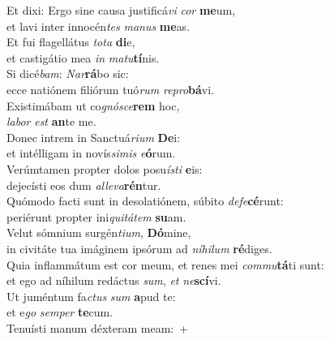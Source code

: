 \oddverse Et dixi: Ergo sine causa justificá\textit{vi} \textit{cor} \textbf{me}um,~\*\\
\oddverse et lavi inter innocén\textit{tes} \textit{ma}\textit{nus} \textbf{me}as.\\
\evenverse Et fui flagellátus \textit{to}\textit{ta} \textbf{di}e,~\*\\
\evenverse et castigátio mea \textit{in} \textit{ma}\textit{tu}\textbf{tí}nis.\\
\oddverse Si dicé\textit{bam}: \textit{Nar}\textbf{rá}bo sic:~\*\\
\oddverse ecce natiónem filiórum tuó\textit{rum} \textit{re}\textit{pro}\textbf{bá}vi.\\
\evenverse Existimábam ut co\textit{gnó}\textit{sce}\textbf{rem} hoc,~\*\\
\evenverse \textit{la}\textit{bor} \textit{est} \textbf{an}te me.\\
\oddverse Donec intrem in Sanctuá\textit{ri}\textit{um} \textbf{De}i:~\*\\
\oddverse et intélligam in novís\textit{si}\textit{mis} \textit{e}\textbf{ó}rum.\\
\evenverse Verúmtamen propter dolos posu\textit{í}\textit{sti} \textbf{e}is:~\*\\
\evenverse dejecísti eos dum \textit{al}\textit{le}\textit{va}\textbf{rén}tur.\\
\oddverse Quómodo facti sunt in desolatiónem, súbito \textit{de}\textit{fe}\textbf{cé}runt:~\*\\
\oddverse periérunt propter ini\textit{qui}\textit{tá}\textit{tem} \textbf{su}am.\\
\evenverse Velut sómnium surgén\textit{ti}\textit{um}, \textbf{Dó}mine,~\*\\
\evenverse in civitáte tua imáginem ipsórum ad \textit{ní}\textit{hi}\textit{lum} \textbf{ré}diges.\\
\oddverse Quia inflammátum est cor meum, et renes mei \textit{com}\textit{mu}\textbf{tá}ti sunt:~\*\\
\oddverse et ego ad níhilum redáctus \textit{sum}, \textit{et} \textit{ne}\textbf{scí}vi.\\
\evenverse Ut juméntum fa\textit{ctus} \textit{sum} \textbf{a}pud te:~\*\\
\evenverse et e\textit{go} \textit{sem}\textit{per} \textbf{te}cum.\\
\oddverse Tenuísti manum déxteram meam:~+\\
